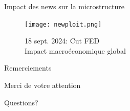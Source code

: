 \documentclass[aspectratio=169]{beamer}  %
\begin{document}
\begin{frame}{Impact des news sur la microstructure}
            \begin{figure}
                \centering
                \texttt{[image: newploit.png]}
                \caption{18 sept. 2024: Cut FED\\
                Impact macroéconomique global}
            \end{figure}
\end{frame}

\begin{frame}{Remerciements}
    \begin{center}
        \Large Merci de votre attention
        \vspace{1cm}
        
        \normalsize
        Questions?
    \end{center}
\end{frame}
\end{document}
